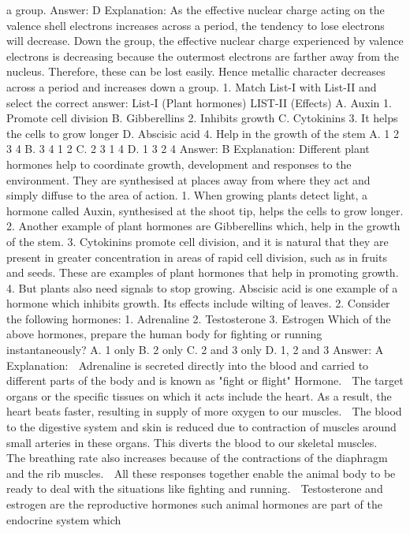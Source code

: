 a group.
Answer: D
Explanation:
As the effective nuclear charge acting on the valence shell electrons
increases across a period, the tendency to lose electrons will
decrease.
Down the group, the effective nuclear charge experienced by
valence electrons is decreasing because the outermost electrons are
farther away from the nucleus. Therefore, these can be lost easily.
Hence metallic character decreases across a period and increases
down a group.
1. Match List-I with List-II and select the correct answer:
List-I (Plant hormones) LIST-II (Effects)
A. Auxin 1. Promote cell division
B. Gibberellins 2. Inhibits growth
C. Cytokinins 3. It helps the cells to grow longer
D. Abscisic acid 4. Help in the growth of the stem
A. 1 2 3 4
B. 3 4 1 2
C. 2 3 1 4
D. 1 3 2 4
Answer: B
Explanation: Different plant hormones help to coordinate growth,
development and responses to the environment. They are
synthesised at places away from where they act and simply diffuse
to the area of action.
1. When growing plants detect light, a hormone called Auxin,
synthesised at the shoot tip, helps the cells to grow longer.
2. Another example of plant hormones are Gibberellins which, help in
the growth of the stem.
3. Cytokinins promote cell division, and it is natural that they are
present in greater concentration in areas of rapid cell division, such
as in fruits and seeds. These are examples of plant hormones that
help in promoting growth.
4. But plants also need signals to stop growing. Abscisic acid is one
example of a hormone which inhibits growth. Its effects include
wilting of leaves.
2. Consider the following hormones:
1. Adrenaline
2. Testosterone
3. Estrogen
Which of the above hormones, prepare the human body for fighting
or running instantaneously?
A. 1 only
B. 2 only
C. 2 and 3 only
D. 1, 2 and 3
Answer: A
Explanation:
 Adrenaline is secreted directly into the blood and carried to
different parts of the body and is known as "fight or
flight" Hormone.
 The target organs or the specific tissues on which it acts
include the heart. As a result, the heart beats faster, resulting
in supply of more oxygen to our muscles.
 The blood to the digestive system and skin is reduced due to
contraction of muscles around small arteries in these organs.
This diverts the blood to our skeletal muscles.
 The breathing rate also increases because of the contractions
of the diaphragm and the rib muscles.
 All these responses together enable the animal body to be
ready to deal with the situations like fighting and running.
 Testosterone and estrogen are the reproductive hormones
such animal hormones are part of the endocrine system which
